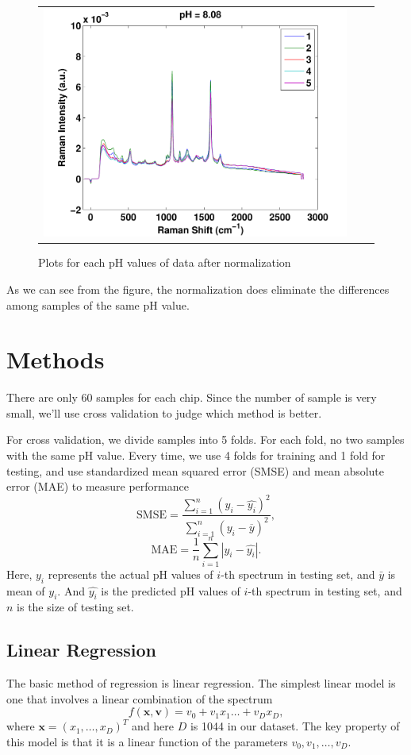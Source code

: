 \documentclass[a4paper]{article}
\newcommand{\bfv}{\mathbf{v}}
\newcommand{\bfx}{\mathbf{x}}
\begin{document}
\begin{figure}[h]
\begin{tabular}{ccc}
\includegraphics[width=.33\textwidth]{images/n12.pdf} \\
\end{tabular}
\caption{Plots for each pH values of data after normalization}\label{pic3}
\end{figure}

As we can see from the figure, the normalization does eliminate the differences among samples of the same pH value.
\section{Methods}
There are only 60 samples for each chip. Since the number of sample is very small, we'll use cross validation to judge which method is better.

For cross validation, we divide samples into 5 folds. For each fold, no two samples with the same pH value. Every time, we use 4 folds for training and 1 fold for testing, and use standardized mean squared error (SMSE) and mean absolute error (MAE) to measure performance%
\begin{equation}
\mathrm{SMSE}=\frac{\displaystyle \sum_{i=1}^n (y_i-\hat{y_i})^2}{\displaystyle \sum_{i=1}^n (y_i-\overline{y})^2},
\end{equation}
\begin{equation}
\mathrm{MAE}=\frac{1}{n} \sum_{i=1}^n |y_i - \hat{y_i}|.
\end{equation}
Here, $y_i$ represents the actual pH values of $i$-th spectrum in testing set, and $\bar{y}$ is mean of $y_i$. And $\hat{y_i}$ is the predicted pH values of $i$-th spectrum in testing set, and $n$ is the size of testing set.
\subsection{Linear Regression}
The basic method of regression is linear regression. The simplest linear model is one that involves a linear combination of the spectrum
\begin{equation}
f(\bfx,\bfv)=v_0+v_1x_1\ldots+v_Dx_D,
\end{equation}
where $\bfx=(x_1,\ldots,x_D)^T$ and here $D$ is 1044 in our dataset. The key property of this model is that it is a linear function of the parameters $v_0,v_1,\ldots,v_D$. 
\end{document}
